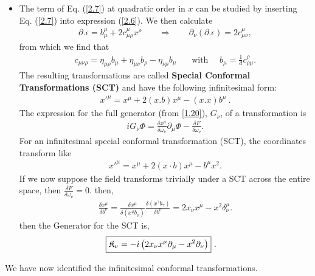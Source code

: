 \documentclass[12pt,a4paper]{report}
\begin{document}
\begin{itemize}
  \item The term of Eq. (\eqref{2.7}) at quadratic order in $x$ can be studied by inserting Eq. (\eqref{2.7}) into expression (\eqref{2.6}). We then calculate
  \begin{align*}
      \partial.\epsilon=b^\mu_\mu+2c^\mu_{\mu\rho}x^\rho~~~~~~~~~\Longrightarrow~~~~~~~~~\partial_\nu(\partial.\epsilon)=2c^\mu_{\mu\nu},
  \end{align*}
  from which we find that
  \begin{align*}
      c_{\mu\nu\rho}=\eta_{\mu\rho}b_\mu+\eta_{\mu\nu}b_\rho-\eta_{\nu\rho}b_\mu~~~~~~~~\text{with}~~~~~~b_\mu=\frac{1}{d}c^\rho_{\rho\mu}.
  \end{align*}
  The resulting transformations are called \textbf{Special Conformal Transformations (SCT)} and have the following infinitesimal form:
  \begin{align}
      x'^\mu=x^\mu+2(x.b)x^\mu-(x.x)b^\mu~.
  \end{align}
  The expression for the full generator \cite{Antonin} (from \eqref{1.20}), $G_{\nu}$, of a transformation is
\begin{align}
    iG_\nu \Phi = \frac{\delta x^{\mu}}{\delta \omega_{\nu}} \partial_{\mu} \Phi - \frac{\delta F}{\delta \omega_\nu}.
\end{align}
For an infinitesimal special conformal transformation (SCT), the coordinates transform like
\begin{align}
    x'^{\mu} = x^{\mu} + 2(x \cdot b)x^{\mu} - b^{\mu}x^2.
\end{align}
If we now suppose the field transforms trivially under a SCT across the entire space, then $\frac{\delta F}{\delta \omega_\nu}=0$.
then,
\begin{align}
    \frac{\delta x^{\mu}}{\delta b^{\nu}} = \frac{\delta x^{\mu}}{\delta (x^{\rho}b_{\rho})} \frac{\delta (x^{\gamma}b_{\gamma})}{\delta b^{\nu}} = 2 x_{\nu}x^{\mu} - x^2 \delta_{\nu}^{\mu}.
\end{align}
then the Generator for the SCT is,
\begin{align}
    \Aboxed{\mathfrak{K}_{{\nu}}=-i\left(2x_{{\nu}}x^{{\mu}}\partial_{{\mu}}-x^2\partial_{{\nu}}\right)}~.
\end{align}
\end{itemize}
We have now identified the infinitesimal conformal transformations.
\end{document}
